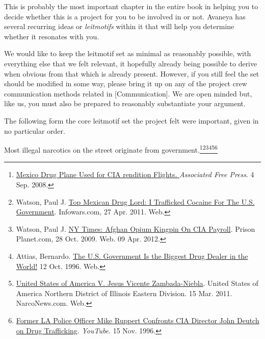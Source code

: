 

This is probably the most important chapter in the entire book in helping you to decide whether this is a project for you to be involved in or not. Avaneya has several recurring ideas or {\it leitmotifs} within it that will help you determine whether it resonates with you.

We would like to keep the leitmotif set as minimal as reasonably possible, with everything else that we felt relevant, it hopefully already being possible to derive when obvious from that which is already present. However, if you still feel the set should be modified in some way, please bring it up on any of the project crew communication methods related in [Communication]. We are open minded but, like us, you must also be prepared to reasonably substantiate your argument.

The following form the core leitmotif set the project felt were important, given in no particular order.

\startitemize[4]
\item
Most illegal narcotics on the street originate from government.\footnote{\href{http://afp.google.com/article/ALeqM5j6QonBKKMo2gw1e3ql-xUcQEZbVg}{Mexico Drug Plane Used for CIA rendition Flights. }{\it Associated Free Press}. 4 Sep. 2008.}\footnote{Watson, Paul J. \href{http://www.infowars.com/top-mexican-drug-lord-i-trafficked-cocaine-for-the-u-s-government/}{Top Mexican Drug Lord: I Trafficked Cocaine For The U.S. Government}. Infowars.com, 27 Apr. 2011. Web.}\footnote{Watson, Paul J. \href{http://www.infowars.com/ny-times-afghan-opium-kingpin-on-cia-payroll/}{NY Times: Afghan Opium Kingpin On CIA Payroll}. Prison Planet.com, 28 Oct. 2009. Web. 09 Apr. 2012.}\footnote{Attias, Bernardo. \href{http://www.csun.edu/~hfspc002/news/cia.drug.html}{The U.S. Government Is the Biggest Drug Dealer in the World!} 12 Oct. 1996. Web.}\footnote{\href{http://narcosphere.narconews.com/userfiles/70/Zambada.Notice.Rule12.3.pdf}{United States of America V. Jesus Vicente Zambada-Niebla}. United States of America Northern District of Illinois Eastern Division. 15 Mar. 2011. NarcoNews.com. Web.}\footnote{\href{http://www.youtube.com/watch?v=UT5MY3C86bk}{Former LA Police Officer Mike Ruppert Confronts CIA Director John Deutch on Drug Trafficking}. {\it YouTube}. 15 Nov. 1996.}


